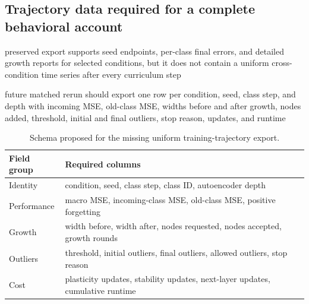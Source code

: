 \subsection{Trajectory data required for a complete behavioral account}
\begin{draftpoints}
  \item preserved export supports seed endpoints, per-class final errors, and detailed growth reports for selected conditions, but it does not contain a uniform cross-condition time series after every curriculum step
  \item future matched rerun should export one row per condition, seed, class step, and depth with incoming MSE, old-class MSE, widths before and after growth, nodes added, threshold, initial and final outliers, stop reason, updates, and runtime
  \item {}
\end{draftpoints}

\begin{table}[htbp]
\centering
\caption{Schema proposed for the missing uniform training-trajectory export.}
\label{tab:trajectory-schema}
\scriptsize
\begin{tabularx}{\textwidth}{p{2.8cm}Y}
\toprule
Field group & Required columns \\
\midrule
Identity & condition, seed, class step, class ID, autoencoder depth \\
Performance & macro MSE, incoming-class MSE, old-class MSE, positive forgetting \\
Growth & width before, width after, nodes requested, nodes accepted, growth rounds \\
Outliers & threshold, initial outliers, final outliers, allowed outliers, stop reason \\
Cost & plasticity updates, stability updates, next-layer updates, cumulative runtime \\
\bottomrule
\end{tabularx}
\end{table}

